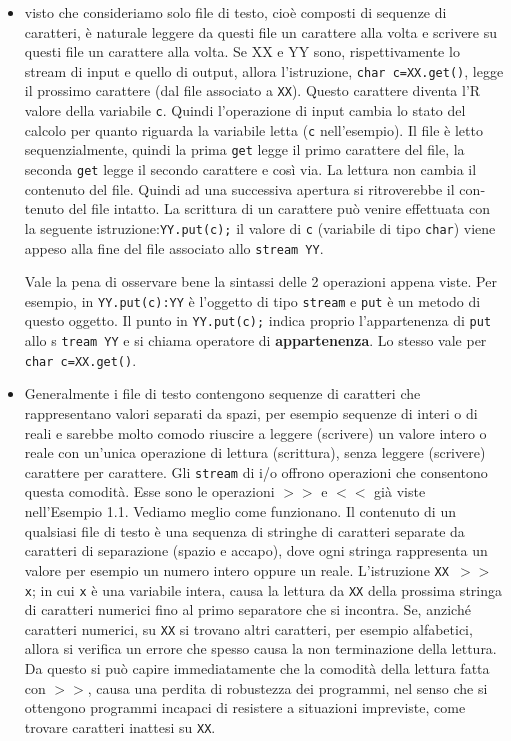 \documentclass[a4paper,12pt]{book}
\begin{document}
\begin{itemize}
\item visto che consideriamo solo file di testo, cioè composti di sequenze di caratteri, è naturale leggere da questi file un carattere alla volta e scrivere su questi file un carattere alla volta. 
Se XX e YY sono, rispettivamente lo stream di input e quello di output, allora l'istruzione, \texttt{char c=XX.get()}, legge il prossimo carattere (dal file associato a \texttt{XX}).
Questo carattere diventa l'R valore della variabile \texttt{c}.
Quindi l'operazione di input cambia lo stato del calcolo per quanto riguarda la variabile letta (\texttt{c} nell'esempio).
Il file è letto sequenzialmente, quindi la prima \texttt{get} legge il primo carattere del file, la seconda \texttt{get} legge il secondo carattere e così via. La lettura non cambia il contenuto del file.
Quindi ad una successiva apertura si ritroverebbe il con­tenuto del file intatto.
La scrittura di un carattere può venire effettuata con la seguente istruzione:\texttt{YY.put(c);} il valore di \texttt{c} (variabile di tipo \texttt{char}) viene appeso alla fine del file associato allo \texttt{stream YY}.

\noindent Vale la pena di osservare bene la sintassi delle 2 operazioni appena viste.
Per esempio, in \texttt{YY.put(c):YY} è l'oggetto di tipo \texttt{stream} e \texttt{put} è un metodo di questo oggetto.
Il punto in \texttt{YY.put(c);} indica proprio l'appartenenza di \texttt{put} allo s \texttt{tream YY} e si chiama operatore di \textbf{appartenenza}.
Lo stesso vale per \texttt{char c=XX.get()}.

\item Generalmente i file di testo contengono sequenze di caratteri che rappresentano valori separati da spazi, per esempio sequenze di interi o di reali e sarebbe molto comodo riuscire a leggere (scrivere) un valore intero o reale con un'unica operazione di lettura (scrittura), senza leggere (scrivere) carattere per carattere.
Gli \texttt{stream} di i/o offrono operazioni che consentono questa comodità.
Esse sono le operazioni $>>$ e $<<$ già viste nell'Esempio 1.1.
Vediamo meglio come funzionano.
Il contenuto di un qualsiasi file di testo è una sequenza di stringhe di caratteri separate da caratteri di separazione (spazio e accapo), dove ogni stringa rappresenta un valore per esempio un numero intero oppure un reale.
L'istruzione \texttt{XX $>>$ x}; in cui \texttt{x} è una variabile intera, causa la lettura da \texttt{XX} della prossima stringa di caratteri numerici fino al primo separatore che si incontra.
Se, anziché caratteri numerici, su \texttt{XX} si trovano altri caratteri, per esempio alfabetici, allora si verifica un errore che spesso causa la non terminazione della lettura.
Da questo si può capire immediatamente che la comodità della lettura fatta con $>>$, causa una perdita di robustezza dei programmi, nel senso che si ottengono programmi incapaci di resistere a situazioni impreviste, come trovare caratteri inattesi su \texttt{XX}.


\end{itemize}
\end{document}
